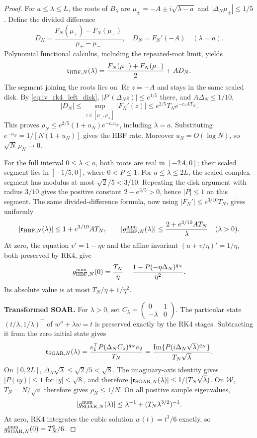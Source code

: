 \documentclass[11pt,a4paper,leqno]{article}
\numberwithin{equation}{section}
\numberwithin{figure}{section}
\numberwithin{table}{section}
\theoremstyle{plain}
\theoremstyle{definition}
\theoremstyle{remark}
\begin{document}
\begin{proof}
For $a\le\lambda\le L$, the roots of $B_\lambda$ are
$\mu_\pm=-A\pm i\sqrt{\lambda-a}$ and
$|\Delta_N\mu_\pm|\le1/5$. Define the divided difference
\[
 D_N=\frac{F_N(\mu_+)-F_N(\mu_-)}{\mu_+-\mu_-},
 \quad D_N=F_N'(-A)\quad(\lambda=a).
\]
Polynomial functional calculus, including the repeated-root limit, yields
\[
 \mathfrak{r}_{{\rm HBF},N}(\lambda)
 =\frac{F_N(\mu_+)+F_N(\mu_-)}2+A D_N.
\]
The segment joining the roots lies on $\operatorname{Re}z=-A$ and
stays in the same scaled disk. By \eqref{eq:iv_rk4_left_disk},
$|P'(\Delta_N z)|\le e^{1/5}$ there, and $A\Delta_N\le1/10$,
\[
 |D_N|\le\sup_{z\in[\mu_-,\mu_+]}|F_N'(z)|
 \le e^{2/5}T_N e^{-c_*AT_N}.
\]
This proves $\rho_N\le e^{2/5}(1+u_N)e^{-c_*u_N}$, including
$\lambda=a$. Substituting $e^{-u_N}=1/[N(1+u_N)]$ gives the HBF rate.
Moreover $u_N=O(\log N)$, so $\sqrt N\,\rho_N\to0$.

For the full interval $0\le\lambda<a$, both roots are real in $[-2A,0]$;
their scaled segment lies in $[-1/5,0]$, where $0<P\le1$.
For $a\le\lambda\le2L$, the scaled complex segment has modulus at most
$\sqrt2/5<3/10$. Repeating the disk argument with radius $3/10$ gives
the positive constant $2-e^{3/5}>0$, hence $|P|\le1$ on this segment.
The same divided-difference formula, now using
$|F_N'|\le e^{3/10}T_N$, gives uniformly
\[
 |\mathfrak{r}_{{\rm HBF},N}(\lambda)|
 \le1+e^{3/10}AT_N,\qquad
 |g_{{\rm HBF},N}^{\rm num}(\lambda)|
 \le\frac{2+e^{3/10}AT_N}{\lambda}\quad(\lambda>0).
\]
At zero, the equation $v'=1-\eta v$ and the affine invariant
$(u+v/\eta)'=1/\eta$, both preserved by RK4, give
\begin{equation}\label{eq:iv_rk4_hbf_zero}
 g_{{\rm HBF},N}^{\rm num}(0)
 =\frac{T_N}{\eta}
  -\frac{1-P(-\eta\Delta_N)^{q_N}}{\eta^2}.
\end{equation}
Its absolute value is at most $T_N/\eta+1/\eta^2$.

\medskip\noindent\textbf{Transformed SOAR.}
For $\lambda>0$, set
$C_\lambda=\left(\begin{smallmatrix}0&1\\-\lambda&0\end{smallmatrix}\right)$.
The particular state $(t/\lambda,1/\lambda)^\top$ of
$w''+\lambda w=t$ is preserved exactly by the RK4 stages.
Subtracting it from the zero initial state gives
\begin{equation}\label{eq:iv_rk4_soar_identity}
 \mathfrak{r}_{{\rm SOAR},N}(\lambda)
 =\frac{e_1^\top P(\Delta_N C_\lambda)^{q_N}e_2}{T_N}
 =\frac{\operatorname{Im}\{P(i\Delta_N\sqrt\lambda)^{q_N}\}}
        {T_N\sqrt\lambda}.
\end{equation}
On $[0,2L]$, $\Delta_N\sqrt\lambda\le\sqrt2/5<\sqrt8$.
The imaginary-axis identity gives $|P(iy)|\le1$ for $|y|\le\sqrt8$,
and therefore $|\mathfrak{r}_{{\rm SOAR},N}(\lambda)|
\le1/(T_N\sqrt\lambda)$. On $\mathcal W$, $T_N=N/\sqrt a$ therefore
gives $\rho_N\le1/N$. On all positive sample eigenvalues,
\[
 |g_{{\rm SOAR},N}^{\rm num}(\lambda)|
 \le\lambda^{-1}+(T_N\lambda^{3/2})^{-1}.
\]
At zero, RK4 integrates the cubic solution $w(t)=t^3/6$ exactly,
so $g_{{\rm SOAR},N}^{\rm num}(0)=T_N^2/6$.


\end{proof}
\end{document}
